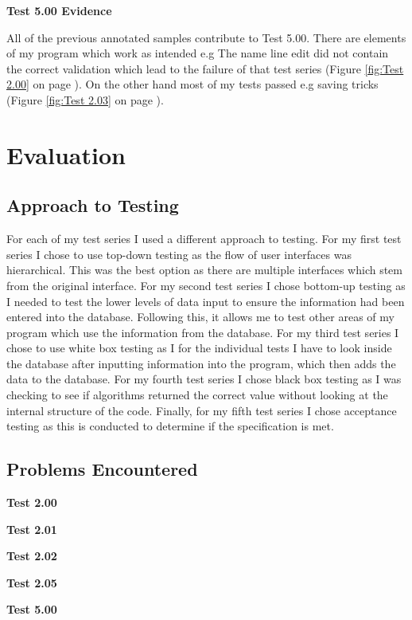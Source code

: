 \textbf{Test 5.00 Evidence}

All of the previous annotated samples contribute to Test 5.00. There are elements of my program which work as intended e.g The name line edit did not contain the correct validation which lead to the failure of that test series  (Figure \ref{fig:Test 2.00} on page \pageref{fig:Test 2.00}). On the other hand most of my tests passed e.g saving tricks  (Figure \ref{fig:Test 2.03} on page \pageref{fig:Test 2.03}).

\section{Evaluation}

\subsection{Approach to Testing}

For each of my test series I used a different approach to testing. For my first test series I chose to use top-down testing as the flow of user interfaces was hierarchical. This was the best option as there are multiple interfaces which stem from the original interface. For my second test series I chose bottom-up testing as I needed to test the lower levels of data input to ensure the information had been entered into the database. Following this, it allows me to test other areas of my program which use the information from the database. For my third test series I chose to use white box testing as I for the individual tests I have to look inside the database after inputting information into the program, which then adds the data to the database. For my fourth test series I chose black box testing as I was checking to see if algorithms returned the correct value without looking at the internal structure of the code. Finally, for my fifth test series I chose acceptance testing as this is conducted to determine if the specification is met.


\subsection{Problems Encountered}

\textbf{Test 2.00}

\textbf{Test 2.01}

\textbf{Test 2.02}

\textbf{Test 2.05}

\textbf{Test 5.00}

